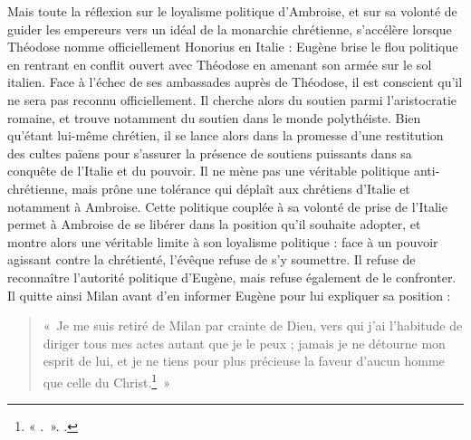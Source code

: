 \bigskip

Mais toute la réflexion sur le loyalisme politique d'Ambroise, et sur sa volonté de guider les empereurs vers un idéal de la monarchie chrétienne, s'accélère lorsque Théodose nomme officiellement Honorius en Italie : Eugène brise le flou politique en rentrant en conflit ouvert avec Théodose en amenant son armée sur le sol italien. Face à l'échec de ses ambassades auprès de Théodose, il est conscient qu'il ne sera pas reconnu officiellement. Il cherche alors du soutien parmi l'aristocratie romaine, et trouve notamment du soutien dans le monde polythéiste. Bien qu'étant lui-même chrétien, il se lance alors dans la promesse d'une restitution des cultes païens pour s'assurer la présence de soutiens puissants dans sa conquête de l'Italie et du pouvoir. Il ne mène pas une véritable politique anti-chrétienne, mais prône une tolérance qui déplaît aux chrétiens d'Italie et notamment à Ambroise. Cette politique couplée à sa volonté de prise de l'Italie permet à Ambroise de se libérer dans la position qu'il souhaite adopter, et montre alors une véritable limite à son loyalisme politique : face à un pouvoir agissant contre la chrétienté, l'évêque refuse de s'y soumettre. Il refuse de reconnaître l'autorité politique d'Eugène, mais refuse également de le confronter. Il quitte ainsi Milan avant d'en informer Eugène pour lui expliquer sa position :

\bigskip

\begin{quote}
«~Je me suis retiré de Milan par crainte de Dieu, vers qui j’ai l’habitude de diriger tous mes actes autant que je le peux ; jamais je ne détourne mon esprit de lui, et je ne tiens pour plus précieuse la faveur d’aucun homme que celle du Christ.\footnote{« .~». \cite[\nopp ec. 10, 1]{ambroise_csel_82_3}.}~»
\end{quote}

\bigskip


